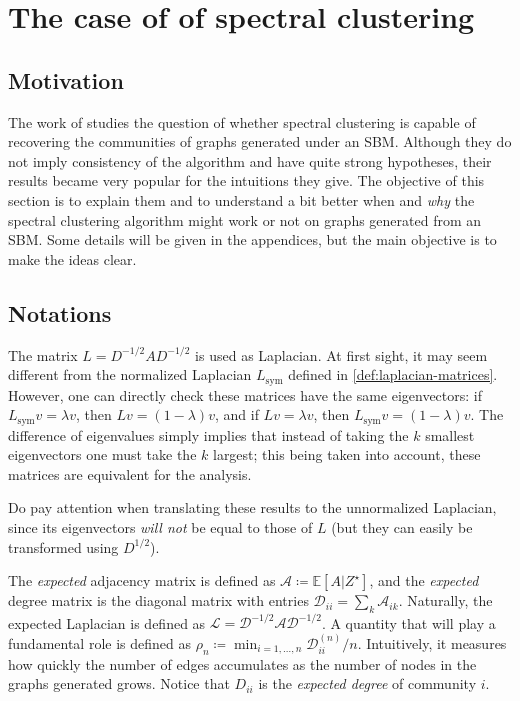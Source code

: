 \documentclass[../../main.tex]{subfiles} %
\begin{document}
	\section{The case of of spectral clustering}  %
	\subsection{Motivation}  %
	The work of \cite{rohe_spectral_2011} studies the question of whether 
	spectral clustering is capable of recovering the communities of graphs 
	generated under an SBM. Although they 
	do not imply consistency of the 
	algorithm and have quite strong hypotheses, their results became very 
	popular for the intuitions they give. The objective of this section is to explain 
	them and to understand a bit better when and \textit{why} the spectral 
	clustering algorithm might work or not on graphs generated from an SBM. 
	Some details will be given in the appendices, but the main objective is to 
	make the ideas clear.
	
	\subsection{Notations}  %
	The matrix \(L = D^{-1/2} A D^{-1/2}\) is used as Laplacian. At first 
	sight, it may seem different from the normalized Laplacian \(L_{\text{sym}}\) 
	defined in \eqref{def:laplacian-matrices}. However, one can directly check 
	these matrices have the same eigenvectors: if \(L_{\text{sym}} v = \lambda 
	v\), then \(L v = (1 - \lambda) v\), and if \(L v = \lambda v\), then 
	\(L_{\text{sym}} v = (1 - \lambda) v\). The difference of eigenvalues simply 
	implies that instead of taking the \(k\) smallest eigenvectors one must take 
	the \(k\) largest; this being taken into account, these matrices are equivalent 
	for the analysis. 
	\begin{remark}
		Do pay attention when translating these results to the unnormalized 
		Laplacian, since its eigenvectors \textit{will not} be equal to those of \(L\) 
		(but they can easily be transformed using \(D^{1/2}\)).
	\end{remark}

	The \textit{expected} adjacency matrix is defined as \(\mathscr A \coloneqq 
	\mathbb E [A \vert Z^{\star}]\), and the \textit{expected} degree matrix is 
	the 
	diagonal matrix with entries \(\mathscr D_{ii} = \sum_k \mathscr A_{ik}\). 
	Naturally, the expected Laplacian is defined as \(\mathscr L = \mathscr 
	D^{-1/2} \mathscr A \mathscr D^{-1/2}\). A quantity that will play a 
	fundamental role is defined as \(\rho_n 
	\coloneqq \min_{i=1, \dots, n} \mathscr D_{ii}^{(n)}/n\). Intuitively, it 
	measures how quickly the number of edges accumulates as the number of 
	nodes in the graphs generated grows. Notice that \(D_{ii}\) is the 
	\textit{expected degree} of community \(i\).
	
\end{document}
